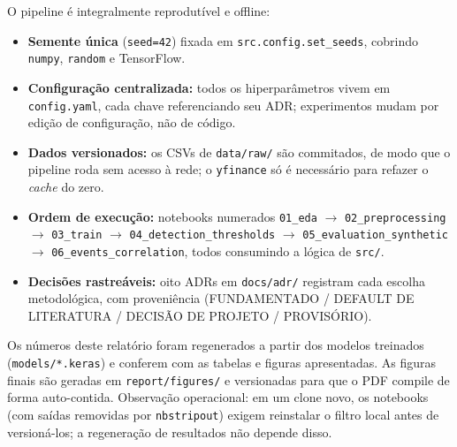 O pipeline é integralmente reprodutível e offline:
\begin{itemize}[noitemsep]
  \item \textbf{Semente única} (\texttt{seed=42}) fixada em \texttt{src.config.set\_seeds}, cobrindo
        \texttt{numpy}, \texttt{random} e TensorFlow.
  \item \textbf{Configuração centralizada:} todos os hiperparâmetros vivem em \texttt{config.yaml},
        cada chave referenciando seu ADR; experimentos mudam por edição de configuração, não de
        código.
  \item \textbf{Dados versionados:} os CSVs de \texttt{data/raw/} são commitados, de modo que o
        pipeline roda sem acesso à rede; o \texttt{yfinance} só é necessário para refazer o
        \emph{cache} do zero.
  \item \textbf{Ordem de execução:} notebooks numerados \texttt{01\_eda} $\to$ \texttt{02\_preprocessing}
        $\to$ \texttt{03\_train} $\to$ \texttt{04\_detection\_thresholds} $\to$
        \texttt{05\_evaluation\_synthetic} $\to$ \texttt{06\_events\_correlation}, todos
        consumindo a lógica de \texttt{src/}.
  \item \textbf{Decisões rastreáveis:} oito ADRs em \texttt{docs/adr/} registram cada escolha
        metodológica, com proveniência (FUNDAMENTADO / DEFAULT DE LITERATURA / DECISÃO DE
        PROJETO / PROVISÓRIO).
\end{itemize}
Os números deste relatório foram regenerados a partir dos modelos treinados
(\texttt{models/*.keras}) e conferem com as tabelas e figuras apresentadas. As figuras finais
são geradas em \texttt{report/figures/} e versionadas para que o PDF compile de forma
auto-contida. Observação operacional: em um clone novo, os notebooks (com saídas removidas por
\texttt{nbstripout}) exigem reinstalar o filtro local antes de versioná-los; a regeneração de
resultados não depende disso.
